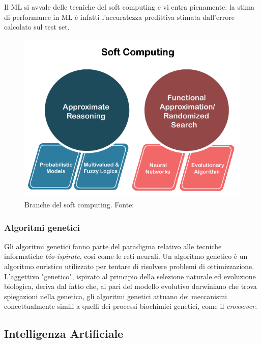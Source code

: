 Il ML si avvale delle tecniche del soft computing \supercite{MLwiki} e vi entra pienamente: la stima di performance in ML è infatti l'accuratezza predittiva stimata dall'errore calcolato sul test set.

\begin{figure}[!h]
	\centering
	\includegraphics[scale=0.4]{images/soft-computing.png}
	\caption{Branche del soft computing. Fonte: \cite{softComputing}}
	\label{fig:soft-computing}
\end{figure}

\subsubsection{Algoritmi genetici}

\par Gli algoritmi genetici fanno parte del paradigma relativo alle tecniche informatiche \textit{bio-ispirate}, così come le reti neurali. Un algoritmo genetico è un algoritmo euristico utilizzato per tentare di risolvere problemi di ottimizzazione. L'aggettivo "genetico", ispirato al principio della selezione naturale ed evoluzione biologica, deriva dal fatto che, al pari del modello evolutivo darwiniano che trova spiegazioni nella genetica, gli algoritmi genetici attuano dei meccanismi concettualmente simili a quelli dei processi biochimici genetici, come il \textit{crossover}.

\subsection{Intelligenza Artificiale}

